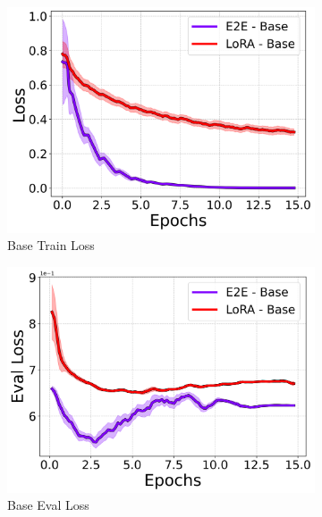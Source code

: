 \documentclass[10pt,twocolumn,letterpaper]{article}
\begin{document}
\begin{figure}[t]
    \begin{subfigure}[b]{0.24\textwidth}
        \centering
        \includegraphics[width=\textwidth]{./base/loss_line.png}
        \caption{Base Train Loss}
    \end{subfigure}
    \begin{subfigure}[b]{0.24\textwidth}
        \centering
        \includegraphics[width=\textwidth]{./base/eval_loss_line.png}
        \caption{Base Eval Loss}
    \end{subfigure}
    \begin{subfigure}[b]{0.24\textwidth}
        \centering

\end{subfigure}
\end{figure}
\end{document}
